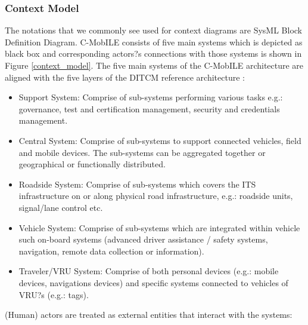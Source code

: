\documentclass[letterpaper, 10 pt, conference]{ieeeconf}  %
\begin{document}
\subsubsection{Context Model}

The notations that we commonly see used for context diagrams are SysML Block Definition Diagram. C-MobILE consists of five main systems which is depicted as black box and corresponding actors?s connections with those systems is shown in Figure \ref{context_model}. The five main systems of the C-MobILE architecture are aligned with the five layers of the DITCM reference architecture \cite{dtcim}:

\begin{itemize}
	\item Support System: Comprise of sub-systems performing various tasks e.g.: governance, test and certification management, security and credentials management.
	\item Central System: Comprise of sub-systems to support connected vehicles, field and mobile devices. The sub-systems can be aggregated together or geographical or functionally distributed.
	\item Roadside System: Comprise of sub-systems which covers the ITS infrastructure on or along physical road infrastructure, e.g.: roadside units, signal/lane control etc.
	\item Vehicle System: Comprise of sub-systems which are integrated within vehicle such on-board systems (advanced driver assistance / safety systems, navigation, remote data collection or information).
	\item Traveler/VRU System: Comprise of both personal devices (e.g.: mobile devices, navigations devices) and specific systems connected to vehicles of VRU?s (e.g.: tags).
\end{itemize}

(Human) actors are treated as external entities that interact with the systems:
\end{document}
